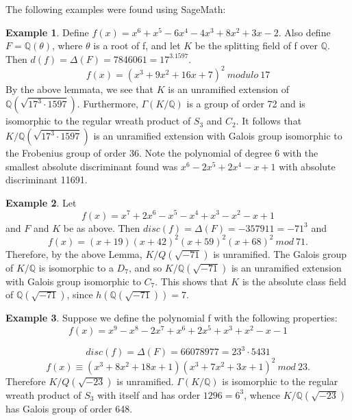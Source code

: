 \documentclass[12pt]{extarticle}
\newcommand{\Q}{\mathbb{Q}}
\newcommand{\<}{\langle}
\renewcommand{\>}{\rangle}
\theoremstyle{definition}
\newtheorem*{example}{Example}
\begin{document}
The following examples were found using SageMath:
\begin{example}
Define $f(x)=x^6 + x^5 - 6x^4 - 4x^3 + 8x^2 + 3x - 2$. Also define $F=\Q(\theta)$, where $\theta$ is a root of f, and let $K$ be the splitting field of f over $\Q$. Then $d(f)=\Delta(F)=7846061=17^3.1597$. 
\begin{equation}
   f(x)= (x^3 + 9x^2 + 16x + 7)^2\:modulo\:17
\end{equation}
By the above lemmata, we see that $K$ is an unramified extension of $\Q(\sqrt{17^3 \cdot 1597})$. Furthermore, $\Gamma(K/\Q)$ is a group of order 72 and is isomorphic to the regular wreath product of $S_3$ and $C_2$. It follows that $K/\Q(\sqrt{17^3 \cdot 1597})$ is an unramified extension with Galois group isomorphic to the Frobenius group of order 36.
Note the polynomial of degree 6 with the smallest absolute discriminant found was $x^6 - 2x^5 + 2x^4 - x + 1$ with absolute discriminant 11691.
\end{example}
\begin{example}
 Let \begin{equation}
     f(x)=x^7 + 2x^6 - x^5 - x^4 + x^3 - x^2 - x + 1
 \end{equation}and $F$ and $K$ be as above.
Then $disc(f)=\Delta(F)=-357911=-71^{3}$ and
\begin{equation}
    f(x)=(x + 19)(x + 42)^2 (x + 59)^2(x + 68)^2\:mod\:71.
\end{equation}
Therefore, by the above Lemma, $K/Q(\sqrt{-71})$ is unramified. The Galois group of $K/\Q$
is isomorphic to a $D_{7}$, and so $K/\Q(\sqrt{-71})$
is an unramified extension with Galois group isomorphic to $C_7$.
This shows that $K$ is the absolute class field of $\Q(\sqrt{-71})$, since $h(\Q(\sqrt{-71}))=7$.
\end{example}
\begin{example}
    Suppose we define the polynomial f with the following properties: \begin{equation}
        f(x) =x^9 - x^8 - 2x^7 + x^6 + 2x^5 + x^3 + x^2 - x - 1
    \end{equation} \par
    \begin{equation}
        disc(f)= \Delta(F)=66078977=23^3 \cdot 5431
    \end{equation} 
    \begin{equation}
        f(x)\equiv(x^3 + 8x^2 + 18x + 1)(x^3 + 7x^2 + 3x + 1)^2\:mod\:23.
    \end{equation}
Therefore  $K/Q(\sqrt{-23})$ is unramified. $\Gamma(K/\Q)$ is isomorphic to the regular wreath product of $S_3$ with itself and has order $1296=6^3$, whence $K/\Q(\sqrt{-23})$ has Galois group of order 648.
\end{example}
\end{document}
